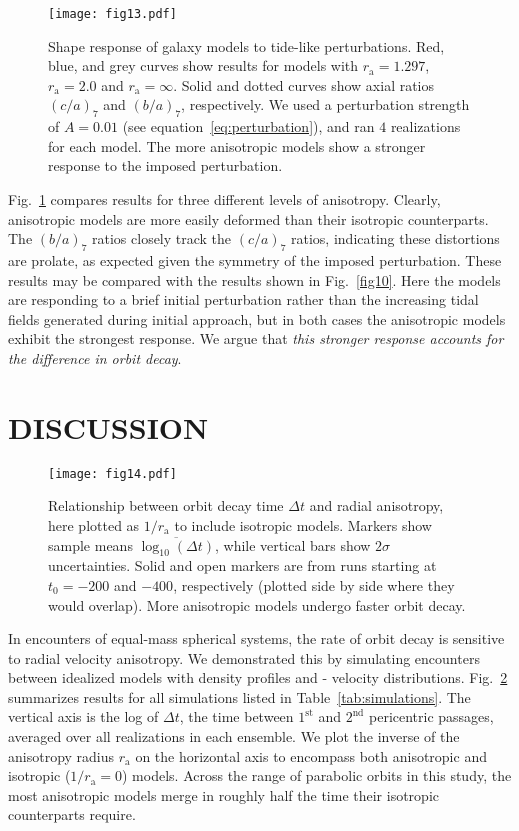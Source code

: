 \documentclass[fleqn,usenatbib]{mnras}
\begin{document}
\begin{figure}
    \centering
    \texttt{[image: fig13.pdf]}
    \caption{Shape response of galaxy models to tide-like perturbations. Red, blue, and grey curves show results for models with $r_\mathrm{a} = 1.297$, $r_\mathrm{a} = 2.0$ and $r_\mathrm{a} = \infty$. Solid and dotted curves show axial ratios $(c/a)_7$ and $(b/a)_7$, respectively. We used a perturbation strength of $A = 0.01$ (see equation~\ref{eq:perturbation}), and ran $4$ realizations for each model. The more anisotropic models show a stronger response to the imposed perturbation.}
    \label{fig13}
\end{figure}

Fig.~\ref{fig13} compares results for three different levels of anisotropy. Clearly, anisotropic models are more easily deformed than their isotropic counterparts. The $(b/a)_7$ ratios closely track the $(c/a)_7$ ratios, indicating these distortions are prolate, as expected given the symmetry of the imposed perturbation. These results may be compared with the results shown in Fig.~\ref{fig10}. Here the models are responding to a brief initial perturbation rather than the increasing tidal fields generated during initial approach, but in both cases the anisotropic models exhibit the strongest response. We argue that \textit{this stronger response accounts for the difference in orbit decay}.

\section{DISCUSSION}
\label{sec:discussion}

\begin{figure}
    \centering
    \texttt{[image: fig14.pdf]}
    \caption{Relationship between orbit decay time $\Delta t$ and radial anisotropy, here plotted as $1/r_\mathrm{a}$ to include isotropic models. Markers show sample means $\overline{\log_{10}(\Delta t)}$, while vertical bars show $2 \sigma$ uncertainties. Solid and open markers are from runs starting at $t_{0} = -200$ and $-400$, respectively (plotted side by side where they would overlap). More anisotropic models undergo faster orbit decay.}
    \label{fig14}
\end{figure}

In encounters of equal-mass spherical systems, the rate of orbit decay is sensitive to radial velocity anisotropy. We demonstrated this by simulating encounters between idealized models with \citet{Hernquist1990} density profiles and \citet{Osipkov1979}-\citet{Merritt1985} velocity distributions. Fig.~\ref{fig14} summarizes results for all simulations listed in Table~\ref{tab:simulations}. The vertical axis is the log of $\Delta t$, the time between $1^\mathrm{st}$ and $2^\mathrm{nd}$ pericentric passages, averaged over all realizations in each ensemble. We plot the inverse of the anisotropy radius $r_\mathrm{a}$ on the horizontal axis to encompass both anisotropic and isotropic ($1/r_{\mathrm{a}} = 0$) models. Across the range of parabolic orbits in this study, the most anisotropic models merge in roughly half the time their isotropic counterparts require.
\end{document}
